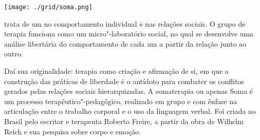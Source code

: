 \pagebreak %

\begin{center}
\hspace*{-3.6cm}
\hspace*{3.1cm}\texttt{[image: ./grid/soma.png]}
\end{center}

\hspace*{-7cm}\hrulefill\hspace*{-7cm}

\medskip

 trata de um  no comportamento individual e nas relações sociais. O grupo de terapia funciona como um micro"-laboratório social, no qual se desenvolve uma análise libertária do comportamento de cada um a partir da relação junto ao outro.

Daí sua originalidade: terapia como criação e afirmação de si, em que a construção das práticas de liberdade é o antídoto para combater os conflitos gerados pelas relações sociais hierarquizadas. A somaterapia ou apenas Soma é um processo terapêutico"-pedagógico, realizado em grupo e com ênfase na articulação entre o trabalho corporal e o uso da linguagem verbal. Foi criada no Brasil pelo escritor e terapeuta Roberto Freire, a partir da obra de Wilhelm Reich e sua pesquisa sobre corpo e emoção.

\vfill

\hspace*{-.4cm}\begin{minipage}[c]{1\linewidth}
\small{
{}}
\end{minipage}

\pagebreak %

